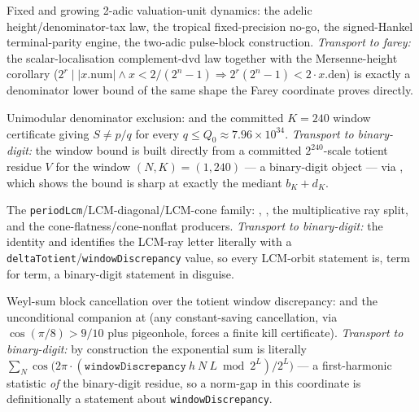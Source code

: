 \begin{description}[leftmargin=*,style=nextline]
\item[p-adic] Fixed and growing 2-adic valuation-unit dynamics: the adelic height/denominator-tax
law, the tropical fixed-precision no-go, the signed-Hankel terminal-parity engine, the two-adic
pulse-block construction. \emph{Transport to farey:} the scalar-localisation complement-dvd law
 together with the
Mersenne-height corollary 
($2^r\mid|x.\mathrm{num}|\wedge x<2/(2^n-1)\Rightarrow 2^r(2^n-1)<2\cdot x.\mathrm{den}$) is exactly
a denominator lower bound of the same shape the Farey coordinate proves directly.

\item[farey] Unimodular denominator exclusion:
 and the committed $K{=}240$ window certificate
giving $S\ne p/q$ for every $q\le Q_0\approx7.96\times10^{34}$. \emph{Transport to binary-digit:}
the window bound is built directly from a committed $2^{240}$-scale totient residue
$V$ for the window $(N,K)=(1,240)$ — a binary-digit object — via
, which shows the bound
is sharp at exactly the mediant $b_K+d_K$.

\item[lcm-orbit] The \texttt{periodLcm}/LCM-diagonal/LCM-cone family:
,
, the multiplicative ray
split, and the cone-flatness/cone-nonflat producers. \emph{Transport to binary-digit:} the identity
 and
identifies the LCM-ray letter literally with a \texttt{deltaTotient}/\texttt{windowDiscrepancy}
value, so every LCM-orbit statement is, term for term, a binary-digit statement in disguise.

\item[first-harmonic/exponential-sum] Weyl-sum block cancellation over the totient window
discrepancy: 
and the unconditional companion at
 (any
constant-saving cancellation, via $\cos(\pi/8)>9/10$ plus pigeonhole, forces a finite kill
certificate). \emph{Transport to binary-digit:} by construction the exponential sum is literally
$\sum_N \cos\bigl(2\pi\cdot(\texttt{windowDiscrepancy}\ h\ N\ L \bmod 2^L)/2^L\bigr)$ — a first-harmonic
statistic \emph{of} the binary-digit residue, so a norm-gap in this coordinate is definitionally a
statement about \texttt{windowDiscrepancy}.

\end{description}


